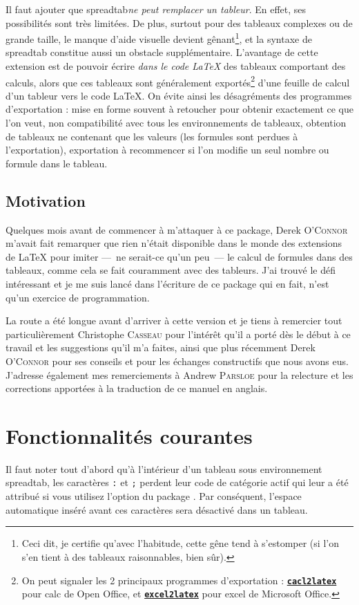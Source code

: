 \documentclass[a4paper,10pt]{article}
\newcommand\ST{\textsf{spreadtab}\xspace}
\newcommand\falseverb[1]{\texttt{\detokenize{#1}}}
\begin{document}
Il faut ajouter que \ST \emph{ne peut remplacer un tableur}. En effet, ses possibilités sont très limitées. De plus, surtout pour des tableaux complexes ou de grande taille, le manque d'aide visuelle devient gênant\footnote{Ceci dit, je certifie qu'avec l'habitude, cette gêne tend à s'estomper (si l'on s'en tient à des tableaux raisonnables, bien sûr).}, et la syntaxe de \ST constitue aussi un obstacle supplémentaire. L'avantage de cette extension est de pouvoir écrire \emph{dans le code \LaTeX} des tableaux comportant des calculs, alors que ces tableaux sont généralement exportés\footnote{On peut signaler les 2 principaux programmes d'exportation : \href{http://calc2latex.sourceforge.net/}{\texttt{\textbf{cacl2latex}}} pour \og calc\fg{} de Open Office, et \href{http://www.ctan.org/tex-archive/support/excel2latex/}{\texttt{\textbf{excel2latex}}} pour \og excel\fg{} de Microsoft Office.} d'une feuille de calcul d'un tableur vers le code \LaTeX. On évite ainsi les désagréments des programmes d'exportation : mise en forme souvent à retoucher pour obtenir exactement ce que l'on veut, non compatibilité avec tous les environnements de tableaux, obtention de tableaux ne contenant que les valeurs (les formules sont perdues à l'exportation), exportation à recommencer si l'on modifie un seul nombre ou formule dans le tableau.

\subsection{Motivation}
Quelques mois avant de commencer à m'attaquer à ce package, Derek \textsc{O'Connor} m'avait fait remarquer que rien n'était disponible dans le monde des extensions de \LaTeX{} pour imiter ---~ne serait-ce qu'un peu~--- le calcul de formules dans des tableaux, comme cela se fait couramment avec des tableurs. J'ai trouvé le défi intéressant et je me suis lancé dans l'écriture de ce package qui en fait, n'est qu'un exercice de programmation.

La route a été longue avant d'arriver à cette version et je tiens à remercier tout particulièrement Christophe \textsc{Casseau} pour l'intérêt qu'il a porté dès le début à ce travail et les suggestions qu'il m'a faites, ainsi que plus récemment Derek \textsc{O'Connor} pour ses conseils et pour les échanges constructifs que nous avons eus. J'adresse également mes remerciements à Andrew \textsc{Parsloe} pour la relecture et les corrections apportées à la traduction de ce manuel en anglais.

\section{Fonctionnalités courantes}
Il faut noter tout d'abord qu'à l'intérieur d'un tableau sous environnement \ST, les caractères \og\verb=:=\fg{} et \og\verb=;=\fg{} perdent leur code de catégorie actif qui leur a été attribué si vous utilisez l'option \falseverb{frenchb} du package \falseverb{babel}. Par conséquent, l'espace automatique inséré avant ces caractères sera désactivé dans un tableau.
\end{document}
